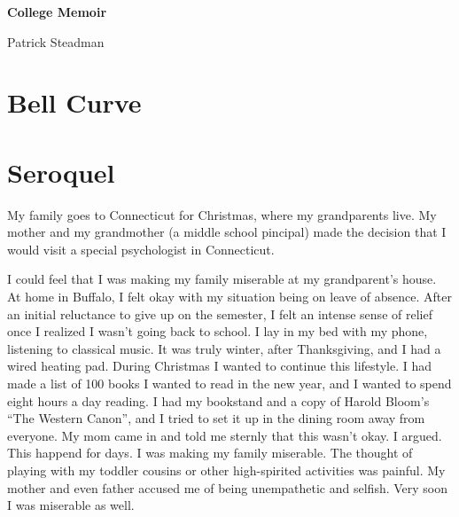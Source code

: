 \documentclass[12pt]{memoir}
\begin{document}
\vspace*{\fill}
\begin{adjustwidth}{1in}{1in}
\begin{center}
\HUGE \textbf{College Memoir}
\end{center}
\bigskip
\begin{center}
\LARGE{Patrick Steadman}\par
\end{center}
\end{adjustwidth}
\vspace*{\fill}

\mainmatter
{}
\chapter[Bell Curve]{Bell Curve}



\chapter{Seroquel}
My family goes to Connecticut for Christmas, where my grandparents live.  My
mother and my grandmother (a middle school pincipal) made the decision that I
would visit a special psychologist in Connecticut.

I could feel that I was making my family miserable at my grandparent's house.
At home in Buffalo, I felt okay with my situation being on leave of absence.
After an initial reluctance to give up on the semester, I felt an intense sense
of relief once I realized I wasn't going back to school.  I lay in my bed with my
phone, listening to classical music.  It was truly winter, after Thanksgiving,
and I had a wired heating pad.  During Christmas I wanted to continue this
lifestyle.  I had made a list of 100 books I wanted to read in the new year,
and I wanted to spend eight hours a day reading.  I had my bookstand and a copy
of Harold Bloom's ``The Western Canon'', and I tried to set it up in the dining
room away from everyone.  My mom came in and told me sternly that this wasn't
okay.  I argued.  This happend for days.  I was making my family miserable.  The
thought of playing with my toddler cousins or other high-spirited activities was
painful.  My mother and even father accused me of being unempathetic and
selfish.  Very soon I was miserable as well.
\end{document}
